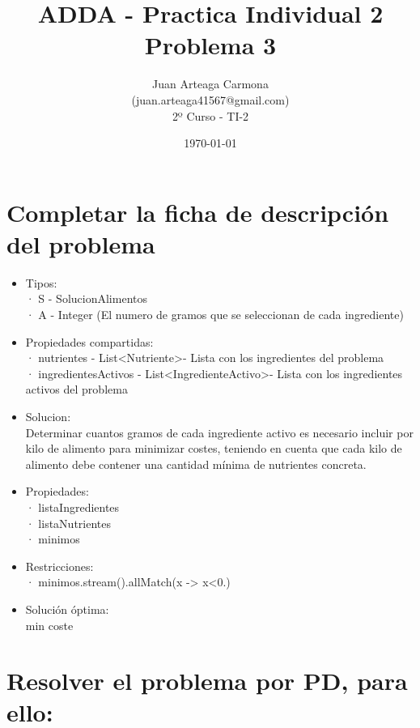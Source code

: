 \documentclass[a4paper,12pt]{article}
\title{ADDA - Practica Individual 2\\ Problema 3}
\author{Juan Arteaga Carmona\\(juan.arteaga41567@gmail.com)\\2º Curso - TI-2}
\date{\today}
\begin{document}
\maketitle

\section{Completar la ficha de descripción del problema}

\begin{itemize}
 \item Tipos:\\
 · S - SolucionAlimentos\\
 · A - Integer \in [0,1000] (El numero de gramos que se seleccionan de cada ingrediente)

 \item Propiedades compartidas:\\
 · nutrientes - List\textless Nutriente\textgreater - Lista con los ingredientes del problema\\
 · ingredientesActivos - List\textless IngredienteActivo\textgreater - Lista con los ingredientes activos del problema

 \item Solucion:\\
Determinar cuantos gramos de cada ingrediente activo es necesario incluir por kilo
de alimento para minimizar costes, teniendo en cuenta que cada kilo de alimento debe
contener una cantidad mínima de nutrientes concreta.

\item Propiedades:\\
  · listaIngredientes\\
  · listaNutrientes\\
  · minimos

\item Restricciones:\\
  · minimos.stream().allMatch(x -> x<0.)
\item Solución óptima:\\
      min coste






\end{itemize}
\section{Resolver el problema por PD, para ello:}
\end{document}
